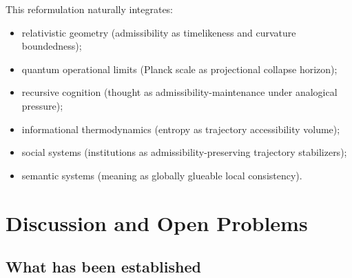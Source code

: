 \documentclass[12pt, a4paper]{article}
\theoremstyle{plain}
\theoremstyle{definition}
\theoremstyle{remark}
\begin{document}
This reformulation naturally integrates:
\begin{itemize}
  \item relativistic geometry (admissibility as timelikeness and
        curvature boundedness);
  \item quantum operational limits (Planck scale as projectional
        collapse horizon);
  \item recursive cognition (thought as admissibility-maintenance
        under analogical pressure);
  \item informational thermodynamics (entropy as trajectory
        accessibility volume);
  \item social systems (institutions as admissibility-preserving
        trajectory stabilizers);
  \item semantic systems (meaning as globally glueable local
        consistency).
\end{itemize}

\section{Discussion and Open Problems}
\label{sec:conclusion}

\subsection{What has been established}
\end{document}
